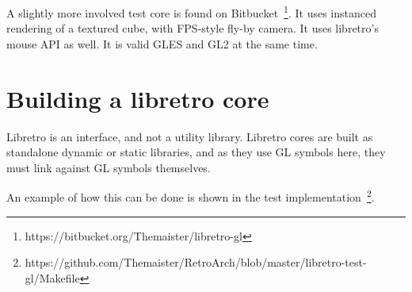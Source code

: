 \documentclass[11pt]{article}
\begin{document}
A slightly more involved test core is found on Bitbucket~\footnote{https://bitbucket.org/Themaister/libretro-gl}. It uses instanced rendering of a textured cube, with FPS-style fly-by camera. It uses libretro's mouse API as well. It is valid GLES and GL2 at the same time.

\section*{Building a libretro core}
Libretro is an interface, and not a utility library. Libretro cores are built as standalone dynamic or static libraries, and as they use GL symbols here, they must link against GL symbols themselves.

An example of how this can be done is shown in the test implementation~\footnote{https://github.com/Themaister/RetroArch/blob/master/libretro-test-gl/Makefile}.
\end{document}
